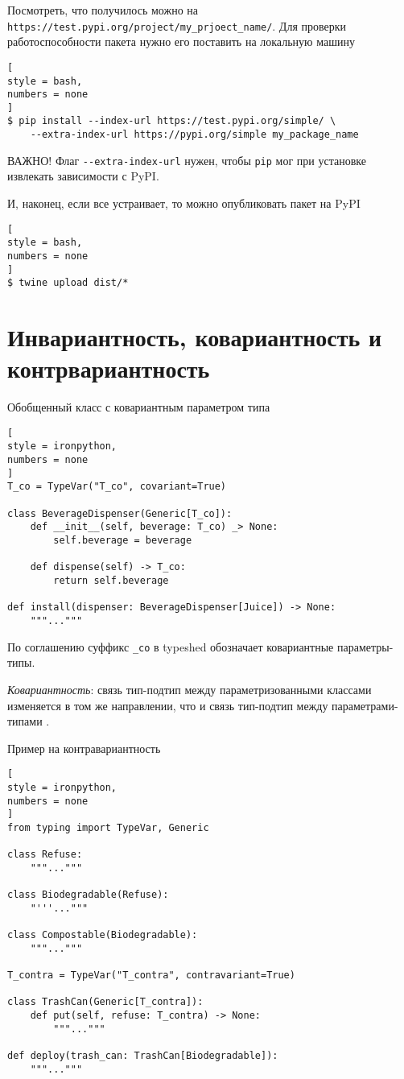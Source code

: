 \documentclass[%
	11pt,
	a4paper,
	utf8,
		]{article}
\begin{document}
Посмотреть, что получилось можно на \verb|https://test.pypi.org/project/my_prjoect_name/|. Для проверки работоспособности пакета нужно его поставить на локальную машину
\begin{lstlisting}[
style = bash,
numbers = none
]
$ pip install --index-url https://test.pypi.org/simple/ \
    --extra-index-url https://pypi.org/simple my_package_name
\end{lstlisting}

ВАЖНО! Флаг \verb|--extra-index-url| нужен, чтобы \verb|pip| мог при установке извлекать зависимости с PyPI.

И, наконец, если все устраивает, то можно опубликовать пакет на PyPI
\begin{lstlisting}[
style = bash,
numbers = none
]
$ twine upload dist/*
\end{lstlisting}


\section{Инвариантность, ковариантность и контрвариантность}

Обобщенный класс с ковариантным параметром типа
\begin{lstlisting}[
style = ironpython,
numbers = none
]
T_co = TypeVar("T_co", covariant=True)

class BeverageDispenser(Generic[T_co]):
    def __init__(self, beverage: T_co) _> None:
        self.beverage = beverage
    
    def dispense(self) -> T_co:
        return self.beverage
          
def install(dispenser: BeverageDispenser[Juice]) -> None:
    """..."""
\end{lstlisting}

По соглашению суффикс \verb*|_co| в typeshed обозначает ковариантные параметры-типы.

\emph{Ковариантность}: связь тип-подтип между параметризованными классами изменяется в том же направлении, что и связь тип-подтип между параметрами-типами \cite[]{ramalho:python-2022}.

Пример на контравариантность 
\begin{lstlisting}[
style = ironpython,
numbers = none
]
from typing import TypeVar, Generic

class Refuse:
    """..."""
    
class Biodegradable(Refuse):
    "'''..."""
    
class Compostable(Biodegradable):
    """..."""

T_contra = TypeVar("T_contra", contravariant=True)

class TrashCan(Generic[T_contra]):
    def put(self, refuse: T_contra) -> None:
        """..."""
        
def deploy(trash_can: TrashCan[Biodegradable]):
    """..."""
\end{lstlisting}
\end{document}
